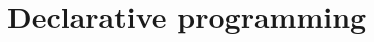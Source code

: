 \documentclass[springer.tex]{subfiles}
\begin{document}
\part{Declarative programming}
\label{part:declarative}
\end{document}
